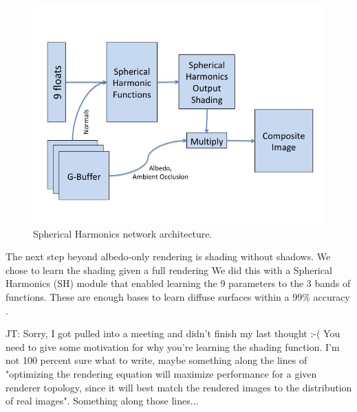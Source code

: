 \documentclass[10pt,twocolumn,letterpaper]{article}
\newcommand{\kris}[1]{{\color{red} KS: #1}}
\newcommand{\tompson}[1]{{\color{green} JT: #1}}
\begin{document}
\begin{figure}[h!]
\centering
\includegraphics[width=1.0\columnwidth]{./assets/SH_model.jpg}
\caption{Spherical Harmonics network architecture.}
\label{fig:SHN}
\end{figure}
The next step beyond albedo-only rendering is shading without shadows. We chose to learn the shading given a full rendering 
We did this with a Spherical Harmonics (SH) module that enabled learning the 9 parameters to the 3 bands of functions.  These are enough bases to learn diffuse surfaces within a 99\% accuracy \cite{Shreiner:2013:OPG:2544032}. 

\tompson{Sorry, I got pulled into a meeting and didn't finish my last thought :-(  You need to give some motivation for why you're learning the shading function. I'm not 100 percent sure what to write, maybe something along the lines of "optimizing the rendering equation will maximize performance for a given renderer topology, since it will best match the rendered images to the distribution of real images". Something along those lines...}
\end{document}

